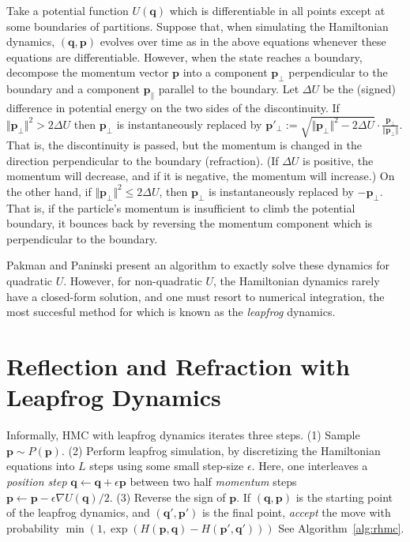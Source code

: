 \documentclass{article} %
\newcommand{\bvec}[1]{\textbf{#1}}
\begin{document}
Take a potential function $U(\bvec{q})$ which is differentiable in all points except at some boundaries of partitions.  Suppose that, when simulating the Hamiltonian dynamics, $(\bvec{q}, \bvec{p})$ evolves over time as in the above equations whenever these equations are differentiable.  However, when the state reaches a boundary, decompose the momentum vector $\bvec{p}$ into a component $\bvec{p}_\perp$ perpendicular to the boundary and a component $\bvec{p}_\parallel$ parallel to the boundary.  
Let $\Delta U$ be the (signed) difference in potential energy on the two sides of the discontinuity.   If $\Vert \bvec{p}_\perp \Vert^2 > 2\Delta U$ then $\bvec{p}_\perp$ is instantaneously replaced by $\bvec{p}'_\perp := \sqrt{ \Vert \bvec{p}_\perp \Vert^2 - 2 \Delta U} \cdot \frac{\bvec{p}_\perp}{\Vert \bvec{p}_\perp \Vert}$. 
That is, the discontinuity is passed, but the momentum is changed in the direction perpendicular to the boundary (refraction).  (If $\Delta U$ is positive, the momentum will decrease, and if it is negative, the momentum will increase.)  On the other hand, if $\Vert \bvec{p}_\perp \Vert^2 \leq 2\Delta U$, then $\bvec{p}_\perp$ is instantaneously replaced by $-\bvec{p}_\perp$.  That is, if the particle's momentum is insufficient to climb the potential boundary, it bounces back by reversing the momentum component which is perpendicular to the boundary.

Pakman and Paninski \cite{pakman2014exact, pakman2013auxiliary} present an algorithm to exactly solve these dynamics for quadratic $U$.  However, for non-quadratic $U$, the Hamiltonian dynamics rarely have a closed-form solution, and one must resort to numerical integration, the most succesful method for which is known as the \emph{leapfrog} dynamics.




\section{Reflection and Refraction with Leapfrog Dynamics}

Informally, HMC with leapfrog dynamics iterates three steps. (1) Sample $\bvec{p} \sim P(\bvec{p})$. (2) Perform leapfrog simulation, by discretizing the Hamiltonian equations into $L$ steps using some small step-size $\epsilon$.  Here, one interleaves a \emph{position step} 
$\bvec{q} \leftarrow \bvec{q} + \epsilon \bvec{p}$ 
between two half \emph{momentum} steps $\bvec{p} \leftarrow \bvec{p} - \epsilon \nabla U(\bvec{q})/2.$ (3) Reverse the sign of $\bvec{p}$. If $(\bvec{q},\bvec{p})$ is the starting point of the leapfrog dynamics, and $(\bvec{q}', \bvec{p}')$ is the final point, \emph{accept} the move with probability $\min(1,\exp(H(\bvec{p},\bvec{q})-H(\bvec{p}', \bvec{q}')))$  See Algorithm~\ref{alg:rhmc}.
\end{document}
